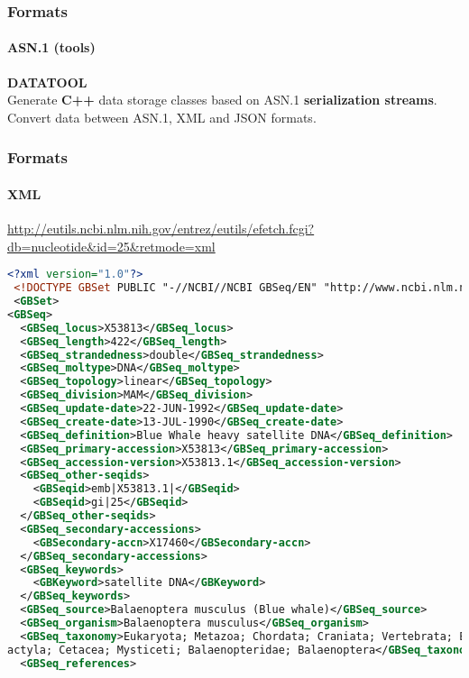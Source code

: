 \documentclass{beamer}
\begin{document}
\begin{frame}[fragile]
\frametitle{Formats}
\framesubtitle{ASN.1 (tools)}
\begin{center}
{\bf DATATOOL}\\
Generate {\bf C++ }data storage classes based on ASN.1
{\bf serialization streams}.\\
Convert data between ASN.1, XML and JSON formats.\\
\end{center}
\end{frame}

\begin{frame}[fragile]
\frametitle{Formats}
\framesubtitle{XML}
\url{http://eutils.ncbi.nlm.nih.gov/entrez/eutils/efetch.fcgi?db=nucleotide&id=25&retmode=xml}
\begin{lstlisting}[language=xml,basicstyle=\tiny,breaklines=false]
<?xml version="1.0"?>
 <!DOCTYPE GBSet PUBLIC "-//NCBI//NCBI GBSeq/EN" "http://www.ncbi.nlm.nih.gov/dtd/NCBI_GBSeq.dtd">
 <GBSet>
<GBSeq>
  <GBSeq_locus>X53813</GBSeq_locus>
  <GBSeq_length>422</GBSeq_length>
  <GBSeq_strandedness>double</GBSeq_strandedness>
  <GBSeq_moltype>DNA</GBSeq_moltype>
  <GBSeq_topology>linear</GBSeq_topology>
  <GBSeq_division>MAM</GBSeq_division>
  <GBSeq_update-date>22-JUN-1992</GBSeq_update-date>
  <GBSeq_create-date>13-JUL-1990</GBSeq_create-date>
  <GBSeq_definition>Blue Whale heavy satellite DNA</GBSeq_definition>
  <GBSeq_primary-accession>X53813</GBSeq_primary-accession>
  <GBSeq_accession-version>X53813.1</GBSeq_accession-version>
  <GBSeq_other-seqids>
    <GBSeqid>emb|X53813.1|</GBSeqid>
    <GBSeqid>gi|25</GBSeqid>
  </GBSeq_other-seqids>
  <GBSeq_secondary-accessions>
    <GBSecondary-accn>X17460</GBSecondary-accn>
  </GBSeq_secondary-accessions>
  <GBSeq_keywords>
    <GBKeyword>satellite DNA</GBKeyword>
  </GBSeq_keywords>
  <GBSeq_source>Balaenoptera musculus (Blue whale)</GBSeq_source>
  <GBSeq_organism>Balaenoptera musculus</GBSeq_organism>
  <GBSeq_taxonomy>Eukaryota; Metazoa; Chordata; Craniata; Vertebrata; Euteleostomi; Mammalia; Eutheria; Laurasiatheria; Cetartiod
actyla; Cetacea; Mysticeti; Balaenopteridae; Balaenoptera</GBSeq_taxonomy>
  <GBSeq_references>
\end{lstlisting}
\end{frame}
\end{document}

